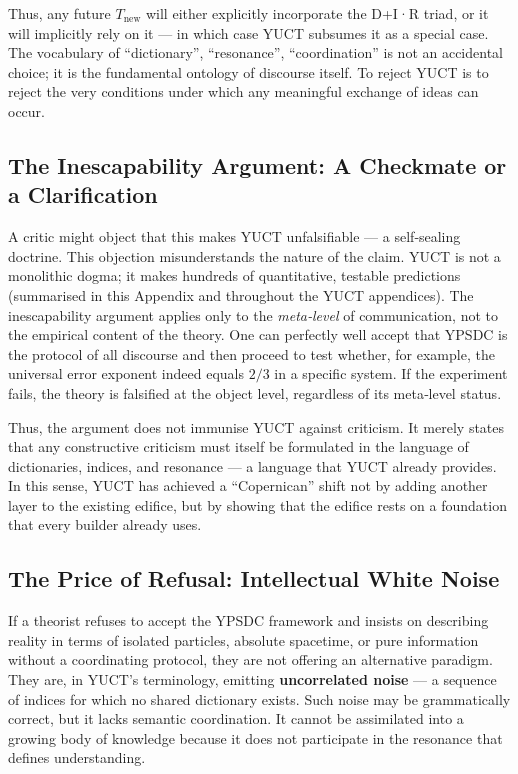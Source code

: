 \documentclass[12pt,a4paper]{article}
\begin{document}
	Thus, any future \(T_{\text{new}}\) will either explicitly incorporate the D+I·R triad, or it will implicitly rely on it — in which case YUCT subsumes it as a special case. The vocabulary of “dictionary”, “resonance”, “coordination” is not an accidental choice; it is the fundamental ontology of discourse itself. To reject YUCT is to reject the very conditions under which any meaningful exchange of ideas can occur.
	
	\subsection{The Inescapability Argument: A Checkmate or a Clarification}
	
	A critic might object that this makes YUCT unfalsifiable — a self‑sealing doctrine. This objection misunderstands the nature of the claim. YUCT is not a monolithic dogma; it makes hundreds of quantitative, testable predictions (summarised in this Appendix and throughout the YUCT appendices). The inescapability argument applies only to the \emph{meta‑level} of communication, not to the empirical content of the theory. One can perfectly well accept that YPSDC is the protocol of all discourse and then proceed to test whether, for example, the universal error exponent indeed equals \(2/3\) in a specific system. If the experiment fails, the theory is falsified at the object level, regardless of its meta‑level status.
	
	Thus, the argument does not immunise YUCT against criticism. It merely states that any constructive criticism must itself be formulated in the language of dictionaries, indices, and resonance — a language that YUCT already provides. In this sense, YUCT has achieved a “Copernican” shift not by adding another layer to the existing edifice, but by showing that the edifice rests on a foundation that every builder already uses.
	
	\subsection{The Price of Refusal: Intellectual White Noise}
	
	If a theorist refuses to accept the YPSDC framework and insists on describing reality in terms of isolated particles, absolute spacetime, or pure information without a coordinating protocol, they are not offering an alternative paradigm. They are, in YUCT’s terminology, emitting \textbf{uncorrelated noise} — a sequence of indices for which no shared dictionary exists. Such noise may be grammatically correct, but it lacks semantic coordination. It cannot be assimilated into a growing body of knowledge because it does not participate in the resonance that defines understanding.
	
\end{document}
